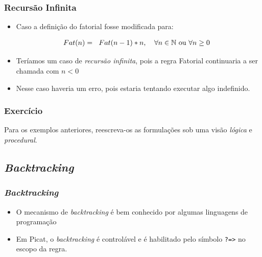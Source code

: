 \begin{frame}[fragile]

\frametitle{Recursão Infinita}

    \begin{itemize}
        \item Caso a definição do fatorial fosse modificada para:
        
        \[
        Fat(n)= 
        \begin{tabular}[c]{ll}
            $Fat(n-1)\ast n$, &$\forall n \in \mathbb{N}$ ou $\forall n \geq 0$
        \end{tabular}
        \]
        \pause
        \item Teríamos um caso de \textit{recursão infinita}, pois a regra Fatorial continuaria
        a ser chamada com $n < 0$
        
        \item Nesse caso haveria um erro, pois estaria tentando executar algo indefinido.
        
    \end{itemize}

\end{frame}



\begin{frame}[fragile]

\frametitle{Exercício}

Para os exemplos anteriores, reescreva-os
as formulações sob uma visão
\textit{lógica} e  \textit{procedural}.

\end{frame}



\subsection{\textit{Backtracking}}
\begin{frame}[fragile]

\frametitle{\textit{Backtracking}}
\begin{itemize}
  \item O mecanismo de \textit{backtracking} é bem conhecido por algumas linguagens de programação

  
  \pause 
  \item Em Picat, o \textit{backtracking} é controlável e é habilitado pelo símbolo
  \verb!?=>! no escopo da regra. 

\end{itemize}

\end{frame}

